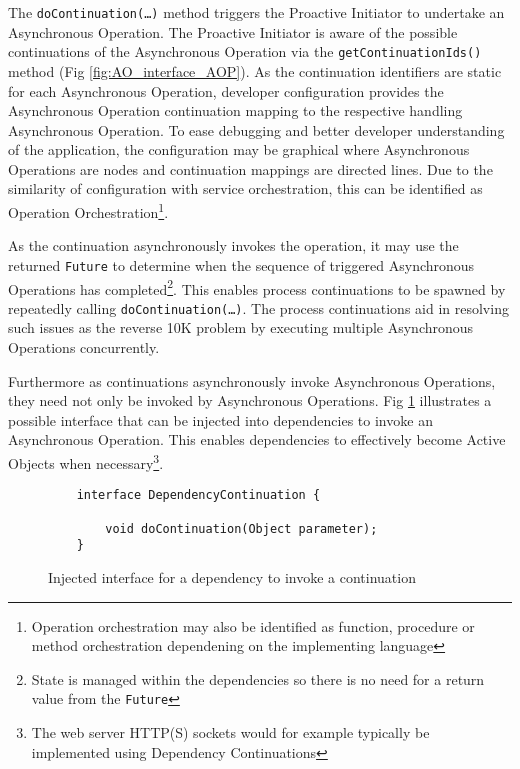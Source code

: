 \documentclass[prodmode]{style/acmlarge}
\begin{document}
The \texttt{doContinuation(\ldots)} method triggers the Proactive Initiator to
undertake an Asynchronous Operation.  The Proactive Initiator is aware of the
possible continuations of the Asynchronous Operation via the
\texttt{getContinuationIds()} method (Fig \ref{fig:AO_interface_AOP}).  As the
continuation identifiers are static for each Asynchronous Operation, developer
configuration provides the Asynchronous Operation continuation mapping to the
respective handling Asynchronous Operation.  To ease debugging and better
developer understanding of the application, the configuration may be graphical
where Asynchronous Operations are nodes and continuation mappings are directed
lines.  Due to the similarity of configuration with service orchestration, this
can be identified as Operation Orchestration\footnote{Operation orchestration
may also be identified as function, procedure or method orchestration
dependening on the implementing language}.

As the continuation asynchronously invokes the operation, it may use the
returned \texttt{Future} to determine when the sequence of triggered
Asynchronous Operations has completed\footnote{State is managed within the
dependencies so there is no need for a return value from the \texttt{Future}}.
This enables process continuations \cite{process-continuation} to be spawned by
repeatedly calling \texttt{doContinuation(\ldots)}.  The process continuations
aid in resolving such issues as the reverse 10K problem
\cite{reverse-ten-k-problem} by executing multiple Asynchronous Operations
concurrently.

Furthermore as continuations asynchronously invoke Asynchronous Operations, they
need not only be invoked by Asynchronous Operations. Fig \ref{fig:DC_interface}
illustrates a possible interface that can be injected into dependencies to
invoke an Asynchronous Operation.  This enables dependencies to effectively
become Active Objects \cite{active-object} when necessary\footnote{The web
server HTTP(S) sockets would for example typically be implemented using
Dependency Continuations}.

\begin{figure}[tp]
\begin{verbatim}
    interface DependencyContinuation {
            
        void doContinuation(Object parameter);
    }
\end{verbatim}
\caption{Injected interface for a dependency to invoke a continuation}
\label{fig:DC_interface}
\end{figure}
\end{document}
